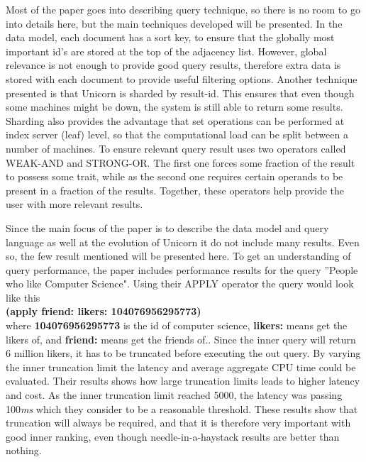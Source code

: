 \documentclass{article}
\begin{document}
\noindent Most of the paper goes into describing query technique, so there is no room to go into details here, but the main techniques developed will be presented. In the data model, each document has a sort key, to ensure that the globally most important id's are stored at the top of the adjacency list. However, global relevance is not enough to provide good query results, therefore extra data is stored with each document to provide useful filtering options. 
Another technique presented is that Unicorn is sharded by result-id. This ensures that even though some machines might be down, the system is still able to return some results. Sharding also provides the advantage that set operations can be performed at index server (leaf) level, so that the computational load can be split between a number of machines. 
To ensure relevant query result uses two operators called WEAK-AND and STRONG-OR. The first one forces some fraction of the result to possess some trait, while as the second one requires certain operands to be present in a fraction of the results. Together, these operators help provide the user with more relevant results. 

\noindent Since the main focus of the paper is to describe the data model and query language as well at the evolution of Unicorn it do not include many results. Even so, the few result mentioned will be presented here. To get an understanding of query performance, the paper includes performance results for the query ''People who like Computer Science". Using their APPLY operator the query would look like this\\

\noindent \textbf{(apply friend: likers: 104076956295773)}\\

where \textbf{104076956295773} is the id of computer science, \textbf{likers:} means get the likers of, and \textbf{friend:} means get the friends of.. Since the inner query will return 6 million likers, it has to be truncated before executing the out query. By varying the inner truncation limit the latency and average aggregate CPU time could be evaluated. Their results shows how large truncation limits leads to higher latency and cost. As the inner truncation limit reached 5000, the latency was passing 100\textit{ms} which they consider to be a reasonable threshold. These results show that truncation will always be required, and that it is therefore very important with good inner ranking, even though needle-in-a-haystack results are better than nothing. \\
\end{document}
